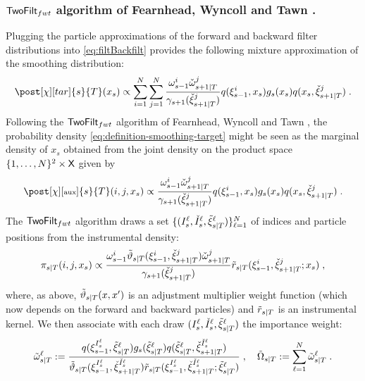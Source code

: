 \subsubsection{ $\mathsf{TwoFilt}_{fwt}$ algorithm of Fearnhead, Wyncoll and Tawn \cite{fearnhead:wyncoll:tawn:2010}.}
Plugging the particle approximations of the forward and backward filter distributions into \eqref{eq:filtBackfilt} provides the following mixture approximation of the smoothing distribution:
\begin{equation}
\label{eq:definition-smoothing-target}
\post[\Xinit][tar]{s}{T}(x_s) \propto \sum_{i=1}^N \sum_{j=1}^N \frac{\ewght{s-1}{i} \ebackwght{s+1}{T}{j}}{\gamma_{s+1}(\ebackpart{s+1}{T}{j})}  q(\epart{s - 1}{i},x_s) g_s(x_s) q(x_s, \ebackpart{s+1}{T}{j}) \eqsp.
\end{equation}
Following the $\mathsf{TwoFilt}_{fwt}$ algorithm of Fearnhead, Wyncoll and Tawn \cite{fearnhead:wyncoll:tawn:2010}, the probability density \eqref{eq:definition-smoothing-target} might be seen as
the marginal density of $x_s$ obtained from the joint density on the product space $\{1,\dots,N\}^2 \times \mathsf{X}$ given by
\begin{equation}
\label{eq:definition-smoothing-auxiliary}
\post[\chi][\aux]{s}{T}(i,j, x_s) \propto \frac{\ewght{s-1}{i} \ebackwght{s+1}{T}{j}}{\gamma_{s+1}(\ebackpart{s+1}{T}{j})} q(\epart{s-1}{i},x_s) g_s(x_s) q(x_s,\ebackpart{s+1}{T}{j})\eqsp.
\end{equation}
The $\mathsf{TwoFilt}_{fwt}$ algorithm draws a set $\{(I_{s}^\ell,\check{I}_{s}^\ell,\tilde{\xi}_{s|T}^{\ell}) \}_{\ell=1}^N$ of indices and particle positions from the instrumental density:
\begin{equation}
\label{eq:auxiliary-proposal-smoothing}
\instrpostaux{s}{T}(i,j,x_s) \propto  \frac{\ewght{s-1}{i} \adjfunc[smooth]{s}{T}{\epart{s-1}{i},\ebackpart{s+1}{T}{j}} \ebackwght{s+1}{T}{j}}{\gamma_{s+1}(\ebackpart{s+1}{T}{j})} \kiss[smooth]{s}{T}(\epart{s-1}{i},\ebackpart{s+1}{T}{j}; x_s)\eqsp,
\end{equation}
where, as above, $\adjfunc[smooth]{s}{T}{x,x'}$ is an adjustment multiplier weight function (which now depends on the forward and backward particles) and $\kiss[smooth]{s}{T}$ is an instrumental kernel. We then associate with each draw $(I_{s}^\ell,\check{I}_{s}^\ell, \tilde{\xi}_{s|T}^{\ell})$ the importance weight:
\begin{equation}
\label{eq:weight-fearnhead}
\smwght{s}{T}{\ell} \eqdef \frac{q(\epart{s-1}{I_{s}^\ell},\smpart{s}{T}{\ell}) g_s(\smpart{s}{T}{\ell}) q(\smpart{s}{T}{\ell},\ebackpart{s+1}{T}{\check{I}_{s}^\ell})}{\adjfunc[smooth]{s}{T}{\epart{s-1}{I_{s}^\ell},\ebackpart{s+1}{T}{\check{I}_{s}^\ell}}
\kiss[smooth]{s}{T}(\epart{s-1}{I_{s}^\ell},\ebackpart{s+1}{T}{\check{I}_{s}^\ell}; \smpart{s}{T}{\ell})}\eqsp,\quad \tilde{\Omega}_{s|T}\eqdef \sum_{\ell=1}^N\smwght{s}{T}{\ell}  \eqsp.
\end{equation}
